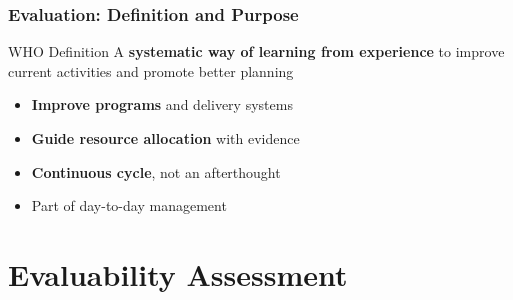 \documentclass{beamer}
\begin{document}
\begin{frame}
\frametitle{Evaluation: Definition and Purpose}

{
\begin{block}{WHO Definition}
A \textbf{systematic way of learning from experience} to improve current activities and promote better planning
\end{block}}

\begin{itemize}[itemsep=0.3em]
    \item \textbf{Improve programs} and delivery systems
    \item \textbf{Guide resource allocation} with evidence
    \item \textbf{Continuous cycle}, not an afterthought
    \item Part of day-to-day management
\end{itemize}

\vspace{0.2cm}
\begin{center}
\end{center}
\end{frame}

\section{Evaluability Assessment}
\end{document}
